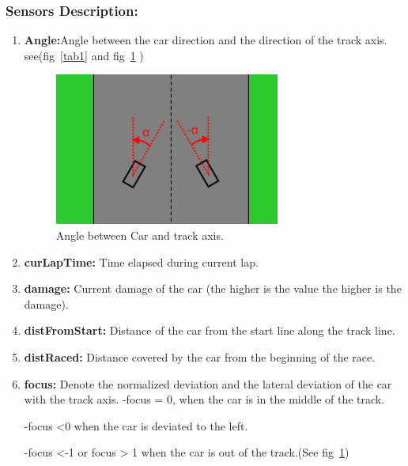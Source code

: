 \documentclass{llncs}
\begin{document}
\subsubsection{Sensors Description:}
\begin{enumerate}
	\item \textbf{Angle:}Angle between the car direction and the direction of the
	track axis. see(fig~\ref{tab1} and fig~\ref{tab11} )
	\begin{figure}[h!]
		
		\centering
		\includegraphics[width=0.7\textwidth]{fig/angle1.PNG}
		\begin{minipage}{10cm}
			\centering
			\caption{\footnotesize Angle between Car and track axis.}
			\label{tab11}
		\end{minipage} 

		
	\end{figure}
	
	\item \textbf{curLapTime:}  Time elapsed during current lap.
	\item\textbf{damage:}  Current damage of the car (the higher is the value the higher
	is the damage).
	\item \textbf{distFromStart:}  Distance of the car from the start line along the track line.
	\item \textbf{distRaced:}  Distance covered by the car from the beginning of the race.
	\item \textbf{focus:}  Denote the normalized deviation and the lateral deviation of the car with the track axis.
	-focus = 0, when the car is in the middle of the track. 
	
	-focus <0 when the car is deviated to the left.
	
	-focus <-1 or focus > 1 when the car is out of the track.(See fig~\ref{tab11})
	\begin{figure}[h!]
		

\end{figure}
\end{enumerate}
\end{document}
